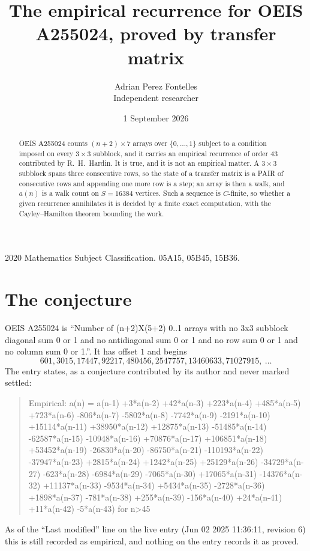 \documentclass[11pt,a4paper]{article}
\title{The empirical recurrence for OEIS A255024, proved by transfer matrix}
\author{Adrian Perez Fontelles\\ \small Independent researcher}
\date{1 September 2026}
\theoremstyle{plain}
\theoremstyle{definition}
\begin{document}
\maketitle

\begin{abstract}
OEIS A255024 counts $(n+2)\times7$ arrays over $\{0,\dots,1\}$ subject to a condition imposed on
every $3\times3$ subblock, and it carries an empirical recurrence of order $43$
contributed by R.~H.~Hardin. It is true, and it is not an empirical matter. A $3\times3$
subblock spans three consecutive rows, so the state of a transfer matrix is a PAIR of
consecutive rows and appending one more row is a step; an array is then a walk, and
$a(n)$ is a walk count on $S=16384$ vertices. Such a sequence is $C$-finite, so whether a given
recurrence annihilates it is decided by a finite exact computation, with the Cayley--Hamilton
theorem bounding the work.
\end{abstract}

\noindent\small 2020 Mathematics Subject Classification. 05A15, 05B45, 15B36.\normalsize

\section{The conjecture}

OEIS A255024 is ``Number of (n+2)X(5+2) 0..1 arrays with no 3x3 subblock diagonal sum 0 or 1 and no antidiagonal sum 0 or 1 and no row sum 0 or 1 and no column sum 0 or 1.''. It has offset $1$ and begins
\[
601, 3015, 17447, 92217, 480456, 2547757, 13460633, 71027915,\ \dots
\]
The entry states, as a conjecture contributed by its author and never marked settled:
\begin{quote}
Empirical: a(n) = a(n-1) +3*a(n-2) +42*a(n-3) +223*a(n-4) +485*a(n-5) +723*a(n-6) -806*a(n-7) -5802*a(n-8) -7742*a(n-9) -2191*a(n-10) +15114*a(n-11) +38950*a(n-12) +12875*a(n-13) -51485*a(n-14) -62587*a(n-15) -10948*a(n-16) +70876*a(n-17) +106851*a(n-18) +53452*a(n-19) -26830*a(n-20) -86750*a(n-21) -110193*a(n-22) -37947*a(n-23) +2815*a(n-24) +1242*a(n-25) +25129*a(n-26) -34729*a(n-27) -623*a(n-28) -6984*a(n-29) -7065*a(n-30) +17065*a(n-31) -14376*a(n-32) +11137*a(n-33) -9534*a(n-34) +5434*a(n-35) -2728*a(n-36) +1898*a(n-37) -781*a(n-38) +255*a(n-39) -156*a(n-40) +24*a(n-41) +11*a(n-42) -5*a(n-43) for n>45
\end{quote}
As of the ``Last modified'' line on the live entry (Jun 02 2025 11:36:11, revision 6) this is still
recorded as empirical, and nothing on the entry records it as proved.
\end{document}
